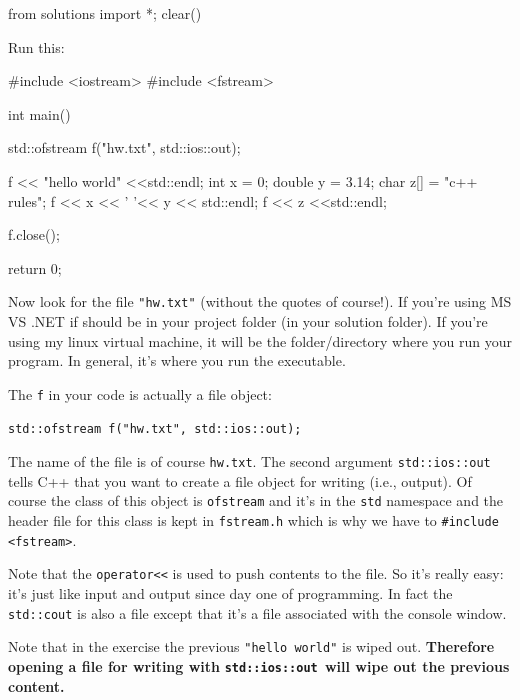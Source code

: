 \begin{python0}
from solutions import *; clear()
\end{python0}

Run this:

\begin{console}
#include <iostream>
#include <fstream>

int main()
{   
    std::ofstream f("hw.txt", std::ios::out);

    f << "hello world" <<std::endl;
    int x = 0;
    double y = 3.14;
    char z[] = "c++ rules";
    f << x << ' '<< y << std::endl;
    f << z <<std::endl;

    f.close();

    return 0;
}
\end{console}

Now look for the file \texttt{"hw.txt"} (without the quotes of course!). If you're using MS VS .NET if should be in your project folder (in your solution folder). If you're using my linux virtual machine, it will be the folder/directory where you run your program. In general, it's where you run the executable.

The \texttt{f} in your code is actually a file object:

\begin{center}
\verb!std::ofstream f("hw.txt", std::ios::out);!
\end{center}

The name of the file is of course \texttt{hw.txt}. The second argument \texttt{std::ios::out} tells C++ that you want to create a file object for writing (i.e., output). Of course the class of this object is \texttt{ofstream} and it's in the \texttt{std} namespace and the header file for this class is kept in \texttt{fstream.h} which is why we have to \verb!#include <fstream>!.

Note that the \texttt{operator<<} is used to push contents to the file. So it's really easy: it's just like input and output since day one of programming. In fact the \texttt{std::cout} is also a file except that it's a file associated with the console window.


Note that in the exercise the previous \texttt{"hello world"} is wiped out. \textbf{Therefore opening a file for writing with }\texttt{\textbf{std::ios::out }}\textbf{will wipe out the previous content.}


